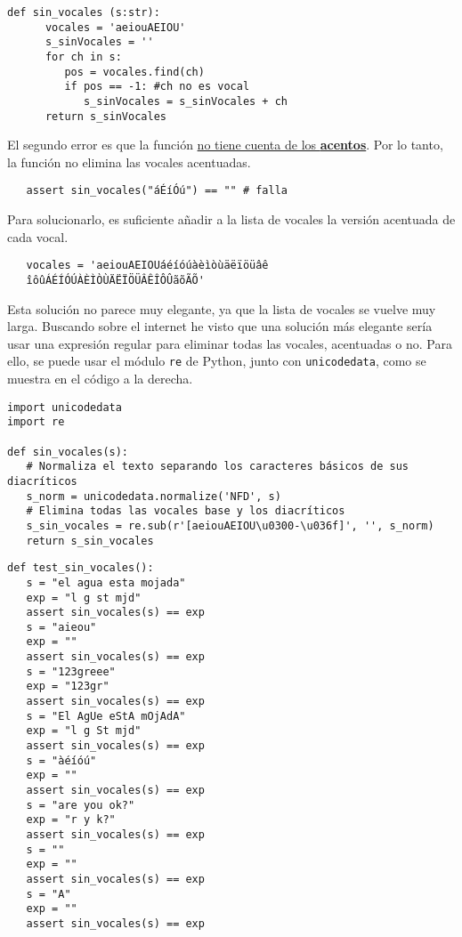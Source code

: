 \begin{lstlisting}[captionpos=b,caption={\lstinline|sin_vocales()| con vocales mayúsculas}, label={code:sin_vocales1}]
   def sin_vocales (s:str):
      vocales = 'aeiouAEIOU'
      s_sinVocales = ''
      for ch in s:
         pos = vocales.find(ch)
         if pos == -1: #ch no es vocal
            s_sinVocales = s_sinVocales + ch
      return s_sinVocales
\end{lstlisting}

\newpage
\begin{paracol}{2}
   \colfill
   El segundo error es que la función \ul{no tiene cuenta de los \textbf{acentos}}. Por lo tanto, la función no elimina las vocales acentuadas.
   \begin{lstlisting}
   assert sin_vocales("áÉíÓú") == "" # falla
   \end{lstlisting}
   Para solucionarlo, es suficiente añadir a la lista de vocales la versión acentuada de cada vocal.

   \begin{lstlisting}
   vocales = 'aeiouAEIOUáéíóúàèìòùäëïöüâê
   îôûÁÉÍÓÚÀÈÌÒÙÄËÏÖÜÂÊÎÔÛãõÃÕ'
   \end{lstlisting}

   Esta solución no parece muy elegante, ya que la lista de vocales se vuelve muy larga. Buscando sobre el internet he visto que una solución más elegante sería usar una expresión regular para eliminar todas las vocales, acentuadas o no. Para ello, se puede usar el módulo \lstinline{re} de Python, junto con \lstinline{unicodedata}, como se muestra en el código a la derecha.
   \colfill

   \switchcolumn
   \colfill
   \begin{lstlisting}[label={code:unicodedata},captionpos=b,caption={Código para eliminar vocales y diacríticos que utiliza \lstinline{unicodedata}}]
import unicodedata
import re

def sin_vocales(s):
   # Normaliza el texto separando los caracteres básicos de sus diacríticos
   s_norm = unicodedata.normalize('NFD', s)
   # Elimina todas las vocales base y los diacríticos
   s_sin_vocales = re.sub(r'[aeiouAEIOU\u0300-\u036f]', '', s_norm)
   return s_sin_vocales
   \end{lstlisting}
   \colfill
\end{paracol}

\vspace{2em}

\begin{lstlisting}[captionpos=b,caption={Pruebas que he escrito}, label={code:pruebas}]
def test_sin_vocales():
   s = "el agua esta mojada"
   exp = "l g st mjd"
   assert sin_vocales(s) == exp
   s = "aieou"
   exp = ""
   assert sin_vocales(s) == exp
   s = "123greee"
   exp = "123gr"
   assert sin_vocales(s) == exp
   s = "El AgUe eStA mOjAdA"
   exp = "l g St mjd"
   assert sin_vocales(s) == exp
   s = "àéíóú"
   exp = ""
   assert sin_vocales(s) == exp
   s = "are you ok?"
   exp = "r y k?"
   assert sin_vocales(s) == exp
   s = ""
   exp = ""
   assert sin_vocales(s) == exp
   s = "A"
   exp = ""
   assert sin_vocales(s) == exp
   
\end{lstlisting}
